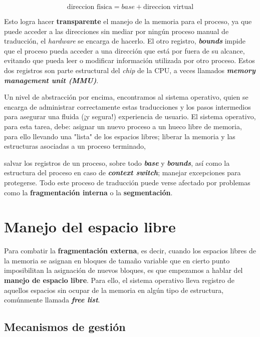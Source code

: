 \documentclass{article}
\begin{document}
	$$\text{direccion fisica} = base + \text{direccion virtual}$$
	
	Esto logra hacer \textbf{transparente} el manejo de la memoria para el proceso, ya que puede acceder a las direcciones sin mediar por ningún proceso manual de traducción, el \textit{hardware} se encarga de hacerlo. El otro registro, \textit{\textbf{bounds}} impide que el proceso pueda acceder a una dirección que está por fuera de su alcance, evitando que pueda leer o modificar información utilizada por otro proceso. Estos dos registros son parte estructural del \textit{chip} de la CPU, a veces llamados \textit{\textbf{memory management unit (MMU)}}.
	
	Un nivel de abstracción por encima, encontramos al sistema operativo, quien se encarga de administrar correctamente estas traducciones y los pasos intermedios para asegurar una fluida (¡y segura!) experiencia de usuario. El sistema operativo, para esta tarea, debe: asignar un nuevo proceso a un hueco libre de memoria, para ello llevando una "lista" de los espacios libres; liberar la memoria y las estructuras asociadas a un proceso terminado, {salvar los registros de un proceso, sobre todo \textit{\textbf{base}} y \textit{\textbf{bounds}}, así como la estructura del proceso en caso de \textit{\textbf{context switch}}; manejar excepciones para protegerse. Todo este proceso de traducción puede verse afectado por problemas como la \textbf{fragmentación interna} o la \textbf{segmentación}.
		
	\section{Manejo del espacio libre}
	Para combatir la \textbf{fragmentación externa}, es decir, cuando los espacios libres de la memoria se asignan en bloques de tamaño variable que en cierto punto imposibilitan la asignación de nuevos bloques, es que empezamos a hablar del \textbf{manejo de espacio libre}. Para ello, el sistema operativo lleva registro de aquellos espacios sin ocupar de la memoria en algún tipo de estructura, comúnmente llamada \textit{\textbf{free list}}.
	
	\subsection{Mecanismos de gestión}
	
}
\end{document}
